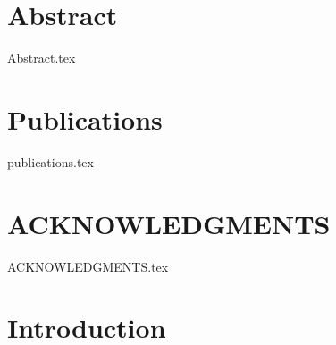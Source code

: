 \documentclass[a4paper,twoside,abstracton,12pt,BCOR=15mm]{scrreprt}
\begin{document}
    
    \listoffigures
    \vspace*{8ex}

    \newpage
    \listoftables
    \vspace*{8ex}
    
\newpage
	\let\oldnumberline\numberline
	\renewcommand{\numberline}{Algorithm~\oldnumberline}
	\listofalgorithms
	\vspace*{8ex}
\endgroup


\chapter{Abstract}
{Abstract.tex}

\chapter{Publications}
{publications.tex}

\chapter{ACKNOWLEDGMENTS}
{ACKNOWLEDGMENTS.tex}

\chapter{Introduction}

\renewcommand{\thepage}{\arabic{page}}
\setcounter{page}{1}
\end{document}

